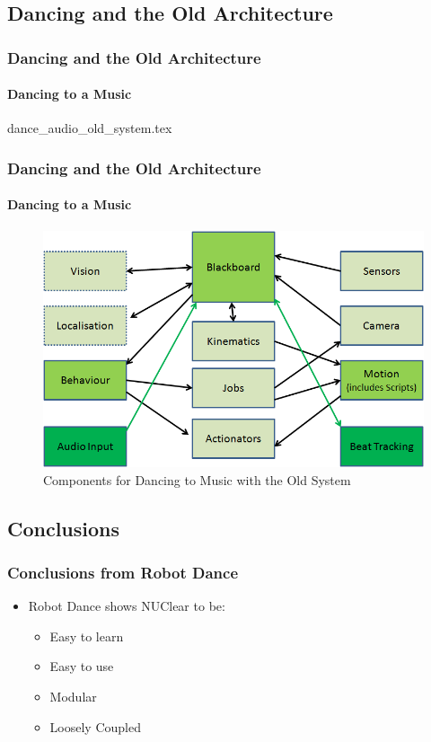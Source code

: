 \documentclass{beamer}
\begin{document}
	\subsection{Dancing and the Old Architecture} %
	\begin{frame} %
		\frametitle{Dancing and the Old Architecture}
		\framesubtitle{Dancing to a Music}
		{dance_audio_old_system.tex}
	\end{frame}	
	\begin{frame} %
		\frametitle{Dancing and the Old Architecture}
		\framesubtitle{Dancing to a Music}
		\begin{figure}
			\centering
			\includegraphics[scale=.45]{Presentation_Images/dance_audio_old_arc.png}
			\caption{Components for Dancing to Music with the Old System}
		\end{figure}
	\end{frame}	
	\subsection{Conclusions} %
	\begin{frame}
		\frametitle{Conclusions from Robot Dance}
			\begin{itemize}
				\item Robot Dance shows NUClear to be:
				\begin{itemize}
					\item Easy to learn
					\item Easy to use
					\item Modular
					\item Loosely Coupled
				\end{itemize}
			\end{itemize}
	\end{frame}	
\end{document}
